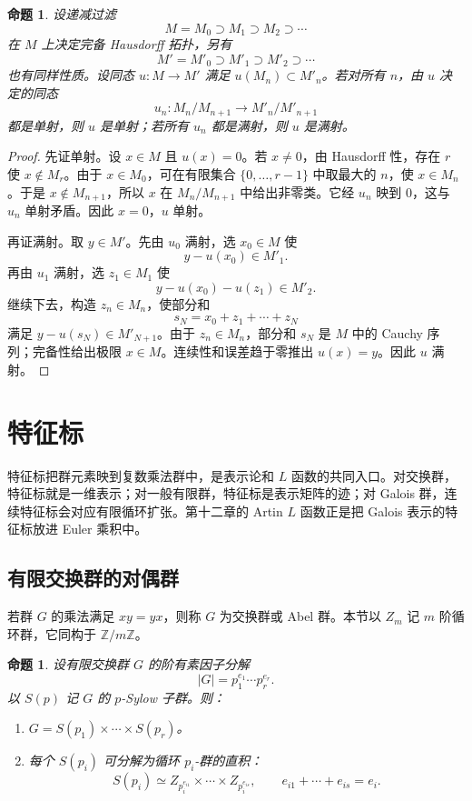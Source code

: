 \documentclass[11pt,a4paper,openany]{ctexbook}
\numberwithin{equation}{chapter}
\newcommand{\Z}{\mathbb{Z}}
\theoremstyle{plain}
\newtheorem{proposition}[theorem]{命题}
\theoremstyle{definition}
\theoremstyle{remark}
\begin{document}
\begin{proposition}
设递减过滤
\[
M=M_0\supset M_1\supset M_2\supset\cdots
\]
在 $M$ 上决定完备 Hausdorff 拓扑，另有
\[
M'=M'_0\supset M'_1\supset M'_2\supset\cdots
\]
也有同样性质。设同态 $u:M\to M'$ 满足 $u(M_n)\subset M'_n$。若对所有 $n$，由 $u$ 决定的同态
\[
u_n:M_n/M_{n+1}\longrightarrow M'_n/M'_{n+1}
\]
都是单射，则 $u$ 是单射；若所有 $u_n$ 都是满射，则 $u$ 是满射。
\end{proposition}

\begin{proof}
先证单射。设 $x\in M$ 且 $u(x)=0$。若 $x\ne0$，由 Hausdorff 性，存在 $r$ 使 $x\notin M_r$。由于 $x\in M_0$，可在有限集合 $\{0,\dots,r-1\}$ 中取最大的 $n$，使 $x\in M_n$。于是 $x\notin M_{n+1}$，所以 $x$ 在 $M_n/M_{n+1}$ 中给出非零类。它经 $u_n$ 映到 $0$，这与 $u_n$ 单射矛盾。因此 $x=0$，$u$ 单射。

再证满射。取 $y\in M'$。先由 $u_0$ 满射，选 $x_0\in M$ 使
\[
y-u(x_0)\in M'_1.
\]
再由 $u_1$ 满射，选 $z_1\in M_1$ 使
\[
y-u(x_0)-u(z_1)\in M'_2.
\]
继续下去，构造 $z_n\in M_n$，使部分和
\[
s_N=x_0+z_1+\cdots+z_N
\]
满足 $y-u(s_N)\in M'_{N+1}$。由于 $z_n\in M_n$，部分和 $s_N$ 是 $M$ 中的 Cauchy 序列；完备性给出极限 $x\in M$。连续性和误差趋于零推出 $u(x)=y$。因此 $u$ 满射。
\end{proof}

\section{特征标}
特征标把群元素映到复数乘法群中，是表示论和 $L$ 函数的共同入口。对交换群，特征标就是一维表示；对一般有限群，特征标是表示矩阵的迹；对 Galois 群，连续特征标会对应有限循环扩张。第十二章的 Artin $L$ 函数正是把 Galois 表示的特征标放进 Euler 乘积中。

\subsection{有限交换群的对偶群}

若群 $G$ 的乘法满足 $xy=yx$，则称 $G$ 为交换群或 Abel 群。本节以 $Z_m$ 记 $m$ 阶循环群，它同构于 $\Z/m\Z$。

\begin{proposition}
设有限交换群 $G$ 的阶有素因子分解
\[
|G|=p_1^{e_1}\cdots p_r^{e_r}.
\]
以 $S(p)$ 记 $G$ 的 $p$-Sylow 子群。则：
\begin{enumerate}[label=(\arabic*)]
\item $G=S(p_1)\times\cdots\times S(p_r)$。
\item 每个 $S(p_i)$ 可分解为循环 $p_i$-群的直积：
\[
S(p_i)\simeq Z_{p_i^{e_{i1}}}\times\cdots\times Z_{p_i^{e_{is}}},
\qquad e_{i1}+\cdots+e_{is}=e_i.
\]
\end{enumerate}
\end{proposition}
\end{document}
